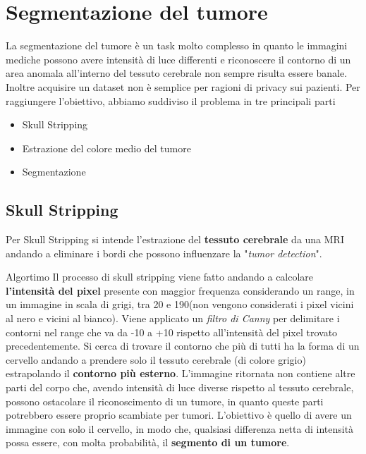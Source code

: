\documentclass{article}
\begin{document}
\section{Segmentazione del tumore}
La segmentazione del tumore è un task molto complesso in quanto le immagini mediche possono avere intensità di luce differenti e 
riconoscere il contorno di un area anomala all'interno del tessuto cerebrale non sempre risulta essere banale.
Inoltre acquisire un dataset non è semplice per ragioni di privacy sui pazienti.
Per raggiungere l'obiettivo, abbiamo suddiviso il problema in tre principali parti
\begin{itemize}
    \item Skull Stripping
    \item Estrazione del colore medio del tumore
    \item Segmentazione
\end{itemize}

\subsection{Skull Stripping}
Per Skull Stripping si intende l'estrazione del \textbf{tessuto cerebrale} da una MRI andando a eliminare i bordi che 
possono influenzare la "\textit{tumor detection}".

\begin{my theorem}{Algortimo}
    Il processo di skull stripping viene fatto andando a calcolare \textbf{l'intensità del pixel} presente con maggior frequenza 
    considerando un range, in un immagine in scala di grigi, tra 20 e 190(non vengono considerati i pixel vicini al nero e
    vicini al bianco).
    Viene applicato un \textit{filtro di Canny} per delimitare i contorni nel range che va da -10 a +10 rispetto all'intensità del
    pixel trovato precedentemente.
    Si cerca di trovare il contorno che più di tutti ha la forma di un cervello andando a prendere solo il tessuto cerebrale
    (di colore grigio) estrapolando il \textbf{contorno più esterno}.
    L'immagine ritornata non contiene altre parti del corpo che, avendo intensità di luce diverse rispetto al tessuto cerebrale,
    possono ostacolare il riconoscimento di un tumore, in quanto queste parti potrebbero essere proprio scambiate per tumori.
    L'obiettivo è quello di avere un immagine con solo il cervello, in modo che, qualsiasi differenza netta di intensità possa essere,
    con molta probabilità, il \textbf{segmento di un tumore}.
\end{my theorem}
\end{document}
